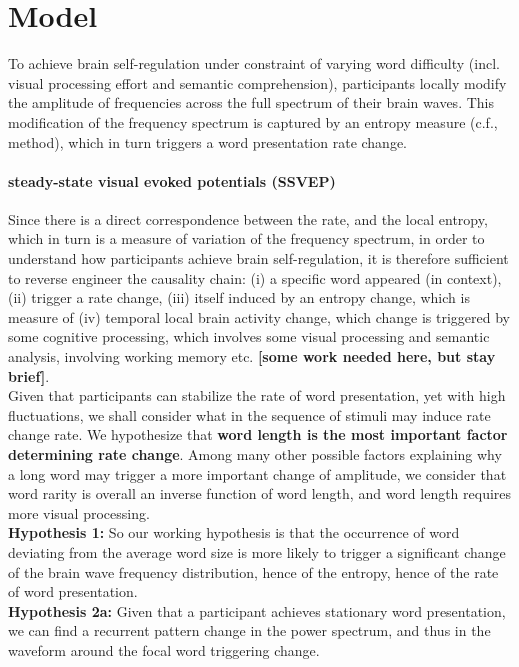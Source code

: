 \section{Model}
To achieve brain self-regulation under constraint of varying word difficulty (incl. visual processing effort and semantic comprehension), participants locally modify the amplitude of frequencies across the full spectrum of their brain waves.  This modification of the frequency spectrum is captured by an entropy measure (c.f., method), which in turn triggers a word presentation rate change.\\

\paragraph{\bf steady-state visual evoked potentials (SSVEP)}

Since there is a direct correspondence between the rate, and the local entropy, which in turn is a measure of variation of the frequency spectrum, in order to understand how participants achieve brain self-regulation, it is therefore sufficient to reverse engineer the causality chain: (i) a specific word appeared (in context), (ii) trigger a rate change, (iii) itself induced by an entropy change, which is measure of (iv) temporal local brain activity change, which change is triggered by some cognitive processing, which involves some visual processing and semantic analysis, involving working memory etc. {\bf [some work needed here, but stay brief]}.\\

Given that participants can stabilize the rate of word presentation, yet with high fluctuations, we shall consider what in the sequence of stimuli may induce rate change rate. We hypothesize that {\bf word length is the most important factor determining rate change}. Among many other possible factors explaining why a long word may trigger a more important change of amplitude, we consider that word rarity is overall an inverse function of word length, and word length requires more visual processing.\\

{\bf Hypothesis 1:} So our working hypothesis is that the occurrence of word deviating from the average word size is more likely to trigger a significant change of the brain wave frequency distribution, hence of the entropy, hence of the rate of word presentation.\\

{\bf Hypothesis 2a:} Given that a participant achieves stationary word presentation, we can find a recurrent pattern change in the power spectrum, and thus in the waveform around the focal word triggering change.\\

